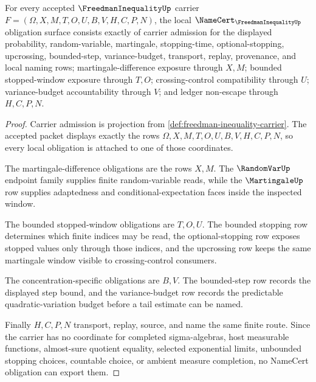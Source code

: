 \begin{theorem}
\label{thm:freedman-inequality-namecert-obligations}
For every accepted $\FreedmanInequalityUp$ carrier $F=(\Omega,X,M,T,O,U,B,V,H,C,P,N)$, the local $\NameCert_{\FreedmanInequalityUp}$ obligation surface consists exactly of carrier admission for the displayed probability, random-variable, martingale, stopping-time, optional-stopping, upcrossing, bounded-step, variance-budget, transport, replay, provenance, and local naming rows; martingale-difference exposure through $X,M$; bounded stopped-window exposure through $T,O$; crossing-control compatibility through $U$; variance-budget accountability through $V$; and ledger non-escape through $H,C,P,N$.
\end{theorem}
\begin{proof}
Carrier admission is projection from \autoref{def:freedman-inequality-carrier}. The accepted packet displays exactly the rows $\Omega,X,M,T,O,U,B,V,H,C,P,N$, so every local obligation is attached to one of those coordinates.

The martingale-difference obligations are the rows $X,M$. The $\RandomVarUp$ endpoint family supplies finite random-variable reads, while the $\MartingaleUp$ row supplies adaptedness and conditional-expectation faces inside the inspected window.

The bounded stopped-window obligations are $T,O,U$. The bounded stopping row determines which finite indices may be read, the optional-stopping row exposes stopped values only through those indices, and the upcrossing row keeps the same martingale window visible to crossing-control consumers.

The concentration-specific obligations are $B,V$. The bounded-step row records the displayed step bound, and the variance-budget row records the predictable quadratic-variation budget before a tail estimate can be named.

Finally $H,C,P,N$ transport, replay, source, and name the same finite route. Since the carrier has no coordinate for completed sigma-algebras, host measurable functions, almost-sure quotient equality, selected exponential limits, unbounded stopping choices, countable choice, or ambient measure completion, no NameCert obligation can export them.
\end{proof}

